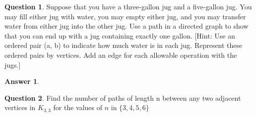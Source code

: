 \documentclass[article, 12pt]{article}
\theoremstyle{definition}
\newtheorem{question}{Question}
\newtheorem{answer}{Answer}
\begin{document}
    \begin{question}
        Suppose that you have a three-gallon jug and a five-gallon jug. You may fill either jug with water, you may empty either jug, and you may transfer water from either jug into the other jug. Use a path in a directed graph to show that you can end up with a jug containing exactly one gallon. [Hint: Use an ordered pair (a, b) to indicate how much water is in each jug. Represent these ordered pairs by vertices. Add an edge for each allowable operation with the jugs.]
    \end{question}

    \begin{answer}
        \begin{figure}[H]
            \centering
        \end{figure}
    \end{answer}
    \begin{question}
        Find the number of paths of length n between any two adjacent vertices in $K_{3,3}$ for the values of $n$ in $\{3, 4, 5, 6\}$
    \end{question}
\end{document}
